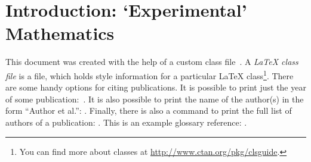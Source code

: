 \chapter{Introduction: `Experimental' Mathematics}
This document was created with the help of a custom class file~\cite{example}. A
{\em \LaTeX{} class file} is a file,
which holds style information for a particular \LaTeX{} class\footnote{You can
find more about classes at \url{http://www.ctan.org/pkg/clsguide}.}. There are some handy options for citing publications. It is possible to print just the year of some publication:~\citeyear{example}. It is also possible to print the name of the author(s) in the form ``Author et al.'': \citeauthor{example}. Finally, there is also a command to print the full list of authors of a publication: \citet*{example}.
This is an example glossary reference: .\\
 
